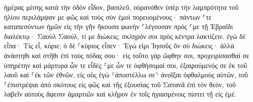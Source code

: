 \documentclass{openreader}
\begin{document}
ἡμέρας μέσης κατὰ τὴν ὁδὸν εἶδον, βασιλεῦ, οὐρανόθεν ὑπὲρ τὴν λαμπρότητα τοῦ ἡλίου περιλάμψαν με φῶς καὶ τοὺς σὺν ἐμοὶ πορευομένους· 
πάντων ⸀τε καταπεσόντων ἡμῶν εἰς τὴν γῆν ἤκουσα φωνὴν ⸀λέγουσαν πρός ⸀με τῇ Ἑβραΐδι διαλέκτῳ· Σαοὺλ Σαούλ, τί με διώκεις; σκληρόν σοι πρὸς κέντρα λακτίζειν. 
ἐγὼ δὲ εἶπα· Τίς εἶ, κύριε; ὁ δὲ ⸀κύριος εἶπεν· Ἐγώ εἰμι Ἰησοῦς ὃν σὺ διώκεις· 
ἀλλὰ ἀνάστηθι καὶ στῆθι ἐπὶ τοὺς πόδας σου· εἰς τοῦτο γὰρ ὤφθην σοι, προχειρίσασθαί σε ὑπηρέτην καὶ μάρτυρα ὧν τε εἶδές ⸀με ὧν τε ὀφθήσομαί σοι, 
ἐξαιρούμενός σε ἐκ τοῦ λαοῦ καὶ ⸀ἐκ τῶν ἐθνῶν, εἰς οὓς ἐγὼ ⸂ἀποστέλλω σε⸃ 
ἀνοῖξαι ὀφθαλμοὺς αὐτῶν, τοῦ ⸀ἐπιστρέψαι ἀπὸ σκότους εἰς φῶς καὶ τῆς ἐξουσίας τοῦ Σατανᾶ ἐπὶ τὸν θεόν, τοῦ λαβεῖν αὐτοὺς ἄφεσιν ἁμαρτιῶν καὶ κλῆρον ἐν τοῖς ἡγιασμένοις πίστει τῇ εἰς ἐμέ. 
\end{document}
